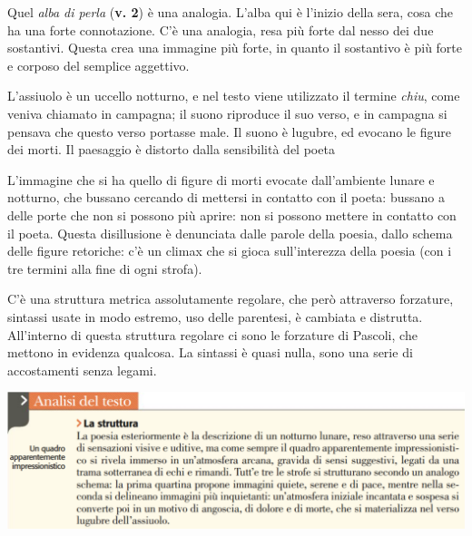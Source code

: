 \documentclass[a4paper, twoside, titlepage]{book}
\begin{document}
Quel \textit{alba di perla} (\textbf{v. 2}) è una analogia. L’alba qui è l’inizio della sera, cosa che ha una forte connotazione.
C’è una analogia, resa più forte dal nesso dei due sostantivi. Questa crea una immagine più forte, in quanto il sostantivo è più forte e corposo del semplice aggettivo.

L'assiuolo è un uccello notturno, e nel testo viene utilizzato il termine \textit{chiu}, come veniva chiamato in campagna; il suono riproduce il suo verso, e in campagna si pensava che questo verso portasse male.
Il suono è lugubre, ed evocano le figure dei morti. Il paesaggio è distorto dalla sensibilità del poeta

L'immagine che si ha quello di figure di morti evocate dall'ambiente lunare e notturno, che bussano cercando di mettersi in contatto con il poeta: bussano a delle porte che non si possono più aprire: non si possono mettere in contatto con il poeta.
Questa disillusione è denunciata dalle parole della poesia, dallo schema delle figure retoriche: c'è un climax che si gioca sull'interezza della poesia (con i tre termini alla fine di ogni strofa).

C'è una struttura metrica assolutamente regolare, che però attraverso forzature, sintassi usate in modo estremo, uso delle parentesi, è cambiata e distrutta. All'interno di questa struttura regolare ci sono le forzature di Pascoli, che mettono in evidenza qualcosa. La sintassi è quasi nulla, sono una serie di accostamenti senza legami.

\begin{center}
\includegraphics[width=\textwidth]{assiuolo1}
\end{center}
\end{document}
